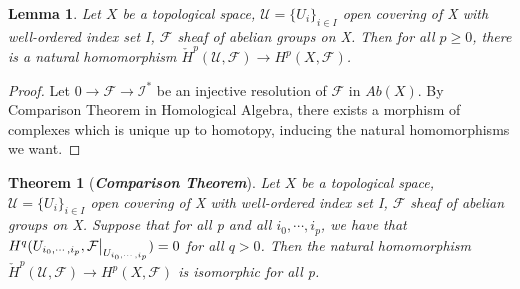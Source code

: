 \documentclass{ctexart}
\newtheorem{theorem}{Theorem}[section]
\newtheorem{lemma}{Lemma}[section]
\begin{document}
\begin{lemma}
    Let $X$ be a topological space, $\mathcal{U} = \{U_{i}\}_{i\in I}$ open covering of X with well-ordered index set I, $\mathcal{F}$ sheaf of abelian groups on X.
    Then for all $p \ge 0$, there is a natural homomorphism $\check{H}^{p}(\mathcal{U}, \mathcal{F}) \longrightarrow H^{p}(X, \mathcal{F})$.
    \label{Lemma 7.6}
\end{lemma}
\begin{proof}
    Let $0 \longrightarrow \mathcal{F} \longrightarrow \mathcal{I}^{\ast}$ be an injective resolution of $\mathcal{F}$ in $Ab(X)$. 
    By Comparison Theorem in Homological Algebra, there exists a morphism of complexes which is unique up to homotopy,
    inducing the natural homomorphisms we want.
\end{proof}
\begin{theorem}[\textbf{\emph{Comparison Theorem}}]
    Let $X$ be a topological space, $\mathcal{U} = \{U_{i}\}_{i\in I}$ open covering of X with well-ordered index set I, $\mathcal{F}$ sheaf of abelian groups on X.
    Suppose that for all p and all $i_{0}, \cdots, i_{p}$, we have that $H^{q}(U_{i_{0}, \cdots, i_{p}}, \mathcal{F}\big{|}_{U_{i_{0}, \cdots, i_{p}}}) = 0$ for all $q > 0$.
    Then the natural homomorphism $\check{H}^{p}(\mathcal{U}, \mathcal{F}) \longrightarrow H^{p}(X, \mathcal{F})$ is isomorphic for all p.
    \label{Theorem 7.5}
\end{theorem}
\end{document}
